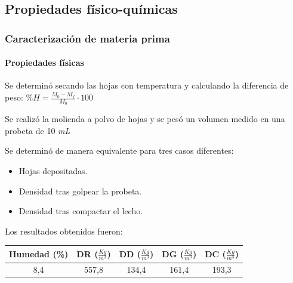 \documentclass[aspectratio=1610]{beamer}
\begin{document}
\subsection{Propiedades físico-químicas}
\begin{frame}
	\frametitle{Caracterización de materia prima}
	\framesubtitle{Propiedades físicas}
	\begin{description}
	\item[Humedad] Se determinó secando las hojas con temperatura y calculando la diferencia de peso:
		$\%H = \frac{M_0 - M_f}{M_0}\cdot 100$ \pause
	\item[Densidad real] Se realizó la molienda a polvo de hojas y se pesó un volumen medido en una
		probeta de 10 \textit{mL} \pause
	\item[Densidad aparente] Se determinó de manera equivalente para tres casos diferentes:
	\begin{itemize}
		\item Hojas depositadas.
		\item Densidad tras golpear la probeta.
		\item Densidad tras compactar el lecho.
	\end{itemize} \pause
	\end{description}
	Los resultados obtenidos fueron:

	\begin{center}
	\begin{tabular}{ccccc}
	\hline
	Humedad (\%) & DR ($\frac{Kg}{m^3}$) & DD ($\frac{Kg}{m^3}$) & DG ($\frac{Kg}{m^3}$) & DC ($\frac{Kg}{m^3}$)
	\vspace{0.1cm}\\
	\hline 
	8,4 & 557,8 & 134,4 & 161,4 & 193,3 \\
	\hline
	\end{tabular}
	\end{center}
\end{frame}
\end{document}
